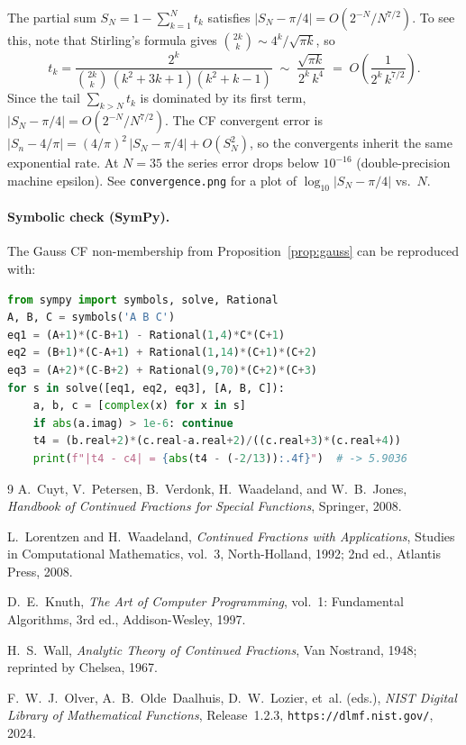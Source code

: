 \documentclass[11pt]{article}
\theoremstyle{remark}
\begin{document}
The partial sum $S_N = 1 - \sum_{k=1}^{N} t_k$ satisfies
$|S_N - \pi/4| = O(2^{-N}/N^{7/2})$.
To see this, note that Stirling's formula gives
$\binom{2k}{k} \sim 4^k/\sqrt{\pi k}$, so
\begin{equation}\label{eq:stirling}
  t_k = \frac{2^k}{\binom{2k}{k}\,(k^2{+}3k{+}1)(k^2{+}k{-}1)}
  \;\sim\;
  \frac{\sqrt{\pi k}}{2^k\,k^4}
  \;=\; O\!\left(\frac{1}{2^k\,k^{7/2}}\right).
\end{equation}
Since the tail $\sum_{k>N} t_k$ is dominated by its first term,
$|S_N - \pi/4| = O(2^{-N}/N^{7/2})$.
The CF convergent error is
$|S_n - 4/\pi| = (4/\pi)^2\,|S_N - \pi/4| + O(S_N^2)$,
so the convergents inherit the same exponential rate.
At $N = 35$ the series error drops
below $10^{-16}$ (double-precision machine epsilon).
See \texttt{convergence.png} for a plot of
$\log_{10}|S_N - \pi/4|$ vs.~$N$.

\paragraph{Symbolic check (SymPy).}
The Gauss CF non-membership from Proposition~\ref{prop:gauss}
can be reproduced with:
\begin{lstlisting}[language=Python]
from sympy import symbols, solve, Rational
A, B, C = symbols('A B C')
eq1 = (A+1)*(C-B+1) - Rational(1,4)*C*(C+1)
eq2 = (B+1)*(C-A+1) + Rational(1,14)*(C+1)*(C+2)
eq3 = (A+2)*(C-B+2) + Rational(9,70)*(C+2)*(C+3)
for s in solve([eq1, eq2, eq3], [A, B, C]):
    a, b, c = [complex(x) for x in s]
    if abs(a.imag) > 1e-6: continue
    t4 = (b.real+2)*(c.real-a.real+2)/((c.real+3)*(c.real+4))
    print(f"|t4 - c4| = {abs(t4 - (-2/13)):.4f}")  # -> 5.9036
\end{lstlisting}


\begin{thebibliography}{9}
A.~Cuyt, V.~Petersen, B.~Verdonk, H.~Waadeland, and W.~B.~Jones,
\emph{Handbook of Continued Fractions for Special Functions},
Springer, 2008.

L.~Lorentzen and H.~Waadeland,
\emph{Continued Fractions with Applications},
Studies in Computational Mathematics, vol.~3,
North-Holland, 1992; 2nd ed., Atlantis Press, 2008.

D.~E.~Knuth,
\emph{The Art of Computer Programming},
vol.~1: Fundamental Algorithms, 3rd ed.,
Addison-Wesley, 1997.

H.~S.~Wall,
\emph{Analytic Theory of Continued Fractions},
Van Nostrand, 1948; reprinted by Chelsea, 1967.

F.~W.~J.~Olver, A.~B.~Olde~Daalhuis, D.~W.~Lozier, et~al.
(eds.),
\emph{NIST Digital Library of Mathematical Functions},
Release~1.2.3, \texttt{https://dlmf.nist.gov/}, 2024.
\end{thebibliography}
\end{document}
